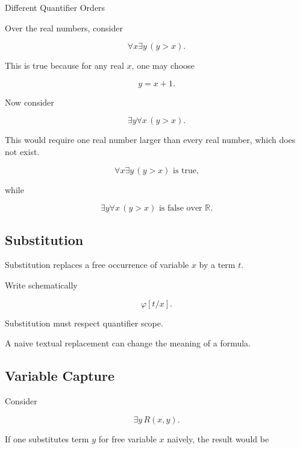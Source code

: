 \begin{workedexamplebox}{Different Quantifier Orders}

Over the real numbers, consider

\[
\forall x\exists y
\,
(y>x).
\]

This is true because for any real \(x\), one may choose

\[
y=x+1.
\]

Now consider

\[
\exists y\forall x
\,
(y>x).
\]

This would require one real number larger than every real number, which
does not exist.

\begin{answerbox}
\[
\boxed{
\forall x\exists y\,(y>x)
\text{ is true,}
}
\]

while

\[
\boxed{
\exists y\forall x\,(y>x)
\text{ is false over }\mathbb{R}.
}
\]
\end{answerbox}

\end{workedexamplebox}

\subsection{Substitution}
\label{subsec:first-order-substitution}

Substitution replaces a free occurrence of variable \(x\) by a term \(t\).

Write schematically

\[
\boxed{
\varphi[t/x].
}
\]

Substitution must respect quantifier scope.

A naive textual replacement can change the meaning of a formula.

\subsection{Variable Capture}
\label{subsec:variable-capture}

Consider

\[
\exists y\,R(x,y).
\]

If one substitutes term \(y\) for free variable \(x\) naively, the result
would be

